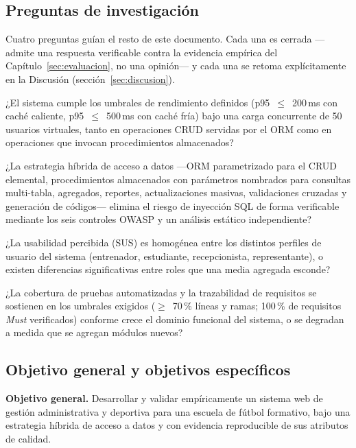 \documentclass[11pt,a4paper]{article}
\begin{document}
\subsection{Preguntas de investigación}
\label{sec:rqs}

Cuatro preguntas guían el resto de este documento. Cada una es cerrada —
admite una respuesta verificable contra la evidencia empírica del
Capítulo~\ref{sec:evaluacion}, no una opinión— y cada una se retoma
explícitamente en la Discusión (sección~\ref{sec:discusion}).

\begin{description}[leftmargin=2.2em, style=nextline]
  \item[RQ1.] ¿El sistema cumple los umbrales de rendimiento definidos
    (p95~$\leq$~200\,ms con caché caliente, p95~$\leq$~500\,ms con caché
    fría) bajo una carga concurrente de 50 usuarios virtuales, tanto en
    operaciones CRUD servidas por el ORM como en operaciones que invocan
    procedimientos almacenados?
  \item[RQ2.] ¿La estrategia híbrida de acceso a datos —ORM parametrizado
    para el CRUD elemental, procedimientos almacenados con parámetros
    nombrados para consultas multi-tabla, agregados, reportes,
    actualizaciones masivas, validaciones cruzadas y generación de
    códigos— elimina el riesgo de inyección SQL de forma verificable
    mediante los seis controles OWASP y un análisis estático
    independiente?
  \item[RQ3.] ¿La usabilidad percibida (SUS) es homogénea entre los
    distintos perfiles de usuario del sistema (entrenador, estudiante,
    recepcionista, representante), o existen diferencias significativas
    entre roles que una media agregada esconde?
  \item[RQ4.] ¿La cobertura de pruebas automatizadas y la trazabilidad de
    requisitos se sostienen en los umbrales exigidos
    ($\geq$~70\,\% líneas y ramas; 100\,\% de requisitos \emph{Must}
    verificados) conforme crece el dominio funcional del sistema, o se
    degradan a medida que se agregan módulos nuevos?
\end{description}

\subsection{Objetivo general y objetivos específicos}
\label{sec:objetivos}

\textbf{Objetivo general.} Desarrollar y validar empíricamente un sistema
web de gestión administrativa y deportiva para una escuela de fútbol
formativo, bajo una estrategia híbrida de acceso a datos y con evidencia
reproducible de sus atributos de calidad.
\end{document}

